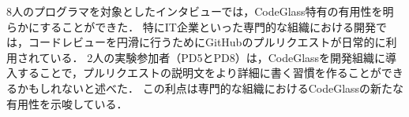 8人のプログラマを対象としたインタビューでは，CodeGlass特有の有用性を明らかにすることができた．
特にIT企業といった専門的な組織における開発では，コードレビューを円滑に行うためにGitHubのプルリクエストが日常的に利用されている．
2人の実験参加者（PD5とPD8）は，CodeGlassを開発組織に導入することで，プルリクエストの説明文をより詳細に書く習慣を作ることができるかもしれないと述べた．
この利点は専門的な組織におけるCodeGlassの新たな有用性を示唆している．


